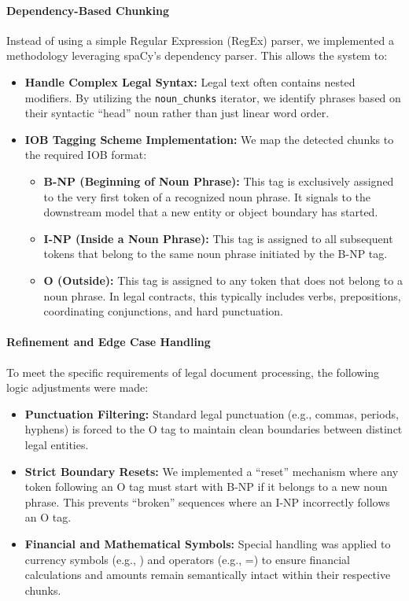 \documentclass[twoside,final]{hcmut-report}
\begin{document}
\paragraph{Dependency-Based Chunking}
Instead of using a simple Regular Expression (RegEx) parser, we implemented a methodology leveraging spaCy’s dependency parser. This allows the system to:
\begin{itemize}[topsep=0pt, parsep=0pt, itemsep=0pt]
  \item \textbf{Handle Complex Legal Syntax:} Legal text often contains nested modifiers. By utilizing the \texttt{noun\_chunks} iterator, we identify phrases based on their syntactic ``head'' noun rather than just linear word order.
  \item \textbf{IOB Tagging Scheme Implementation:} We map the detected chunks to the required IOB format:
        \begin{itemize}[topsep=0pt, parsep=0pt, itemsep=0pt]
          \item \textbf{B-NP (Beginning of Noun Phrase):} This tag is exclusively assigned to the very first token of a recognized noun phrase. It signals to the downstream model that a new entity or object boundary has started.
          \item \textbf{I-NP (Inside a Noun Phrase):} This tag is assigned to all subsequent tokens that belong to the same noun phrase initiated by the B-NP tag.
          \item \textbf{O (Outside):} This tag is assigned to any token that does not belong to a noun phrase. In legal contracts, this typically includes verbs, prepositions, coordinating conjunctions, and hard punctuation.
        \end{itemize}
\end{itemize}

\paragraph{Refinement and Edge Case Handling}
To meet the specific requirements of legal document processing, the following logic adjustments were made:

\begin{itemize}[topsep=0pt, parsep=0pt, itemsep=0pt]
  \item \textbf{Punctuation Filtering:} Standard legal punctuation (e.g., commas, periods, hyphens) is forced to the O tag to maintain clean boundaries between distinct legal entities.
  \item \textbf{Strict Boundary Resets:} We implemented a ``reset'' mechanism where any token following an O tag must start with B-NP if it belongs to a new noun phrase. This prevents ``broken'' sequences where an I-NP incorrectly follows an O tag.
  \item \textbf{Financial and Mathematical Symbols:} Special handling was applied to currency symbols (e.g., \textdollar) and operators (e.g., =) to ensure financial calculations and amounts remain semantically intact within their respective chunks.
\end{itemize}
\end{document}
